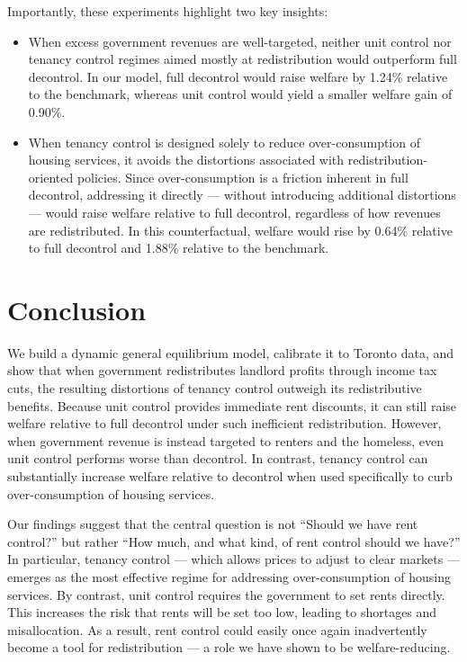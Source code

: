 \documentclass[parskip=full]{article}
\begin{document}
Importantly, these experiments highlight two key insights:
\begin{itemize}
  \item When excess government revenues are well-targeted, neither unit control nor tenancy control regimes aimed mostly at redistribution would outperform full decontrol. In our model, full decontrol would raise welfare by 1.24\% relative to the benchmark, whereas unit control would yield a smaller welfare gain of 0.90\%.
  \item When tenancy control is designed solely to reduce over-consumption of housing services, it avoids the distortions associated with redistribution-oriented policies. Since over-consumption is a friction inherent in full decontrol, addressing it directly — without introducing additional distortions — would raise welfare relative to full decontrol, regardless of how revenues are redistributed. In this counterfactual, welfare would rise by 0.64\% relative to full decontrol and 1.88\% relative to the benchmark.
\end{itemize}

\section{Conclusion}\label{sec:conclusion}

We build a dynamic general equilibrium model, calibrate it to Toronto data, and show that when government redistributes landlord profits through income tax cuts, the resulting distortions of tenancy control outweigh its redistributive benefits. Because unit control provides immediate rent discounts, it can still raise welfare relative to full decontrol under such inefficient redistribution. However, when government revenue is instead targeted to renters and the homeless, even unit control performs worse than decontrol. In contrast, tenancy control can substantially increase welfare relative to decontrol when used specifically to curb over-consumption of housing services.

Our findings suggest that the central question is not “Should we have rent control?” but rather “How much, and what kind, of rent control should we have?” In particular, tenancy control — which allows prices to adjust to clear markets — emerges as the most effective regime for addressing over-consumption of housing services. By contrast, unit control requires the government to set rents directly. This increases the risk that rents will be set too low, leading to shortages and misallocation. As a result, rent control could easily once again inadvertently become a tool for redistribution — a role we have shown to be welfare-reducing.
\end{document}
